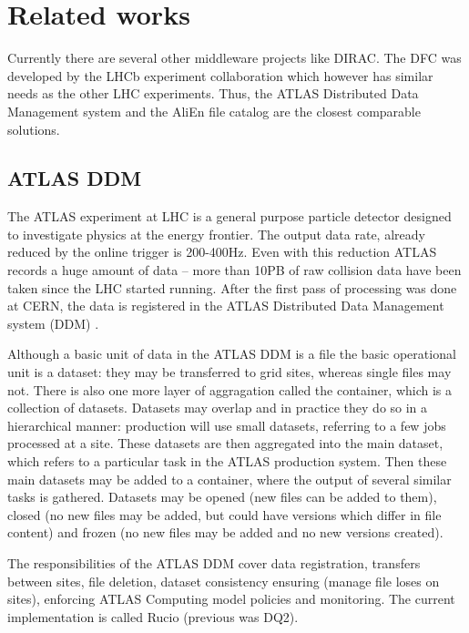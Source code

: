 \chapter{Related works}

Currently there are several other middleware projects like DIRAC. The DFC was developed by the LHCb experiment 
collaboration which however has similar needs as the other LHC experiments. Thus, the ATLAS
Distributed Data Management system and the AliEn file catalog are the closest comparable solutions.


\section{ATLAS DDM}
The ATLAS experiment at LHC is a general purpose particle detector designed to investigate physics at the energy
frontier. The output data rate, already reduced by the online trigger is  200-400Hz. Even with this reduction 
ATLAS records a huge amount of data – more than 10PB of raw collision data have been taken since the LHC
started running. After the first pass of processing was done at CERN, the data is registered in the ATLAS 
Distributed Data Management system (DDM) \cite{ATLASDDM1}.

Although a basic unit of data in the ATLAS DDM is a file the basic operational unit is a dataset: they may be
transferred to grid sites, whereas single files may not. There is also one more layer of aggragation called the 
container, which is a collection of datasets. Datasets may overlap and in practice they do so in a 
hierarchical manner: production will use small datasets, referring to a few jobs processed at a site. These datasets
are then aggregated into the main dataset, which refers to a particular task in the ATLAS
production system. Then these main datasets may be added to a container, where the output of several 
similar tasks is gathered. Datasets may be opened (new files can be added to them), closed (no new files
may be added, but could have versions which differ in file content) and frozen (no new files may be added and no 
new versions created). 

The responsibilities of the ATLAS DDM cover data registration, transfers between sites, file deletion, dataset 
consistency ensuring (manage file loses on sites), enforcing ATLAS Computing model policies and monitoring. The
current implementation is called Rucio (previous was DQ2).


